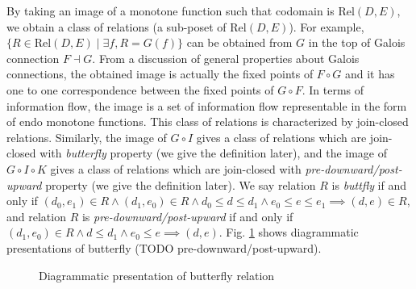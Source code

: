 \documentclass{easychair}
\theoremstyle{definition}
\newcommand{\Rel}{\mathrm{Rel}}
\newcommand{\comp}{\circ}
\newcommand{\rotleq}{\rotatebox[origin=c]{90}{$\leq$}}
\begin{document}
By taking an image of a monotone function such that codomain is $\Rel(D, E)$,
we obtain a class of relations (a sub-poset of $\Rel(D, E)$). For
example, $\{ R \in \Rel(D, E) \mid \exists f, R = G(f) \}$ can be obtained from $G$
in the top of Galois connection $F \dashv G$. From a discussion of general
properties about Galois connections, the obtained image is actually the
fixed points of $F \comp G$ and it has one to one correspondence between
the fixed points of $G \comp F$. In terms of information flow, the image
is a set of information flow representable in the form of endo
monotone functions. This class of relations is characterized by join-closed relations.
Similarly, the image of $G \comp I$ gives a class of relations which are join-closed with \emph{butterfly} property (we give the definition later), and the image of $G \comp I \comp K$ gives a class of relations which are join-closed with \emph{pre-downward/post-upward} property (we give the definition later). We say relation $R$ is \emph{buttfly} if and only if $(d_{0}, e_{1}) \in R \land (d_{1}, e_{0}) \in R \land d_{0} \leq d \leq d_{1} \land e_{0} \leq e \leq e_{1} \implies (d , e) \in R$, and relation $R$ is \emph{pre-downward/post-upward} if and only if $(d_{1}, e_{0}) \in R \land d \leq d_{1} \land e_{0} \leq e \implies (d , e)$. Fig. \ref{fig:butterfly} shows diagrammatic presentations of butterfly (TODO pre-downward/post-upward).

\begin{figure}[h]
  \centering
  \label{fig:butterfly}
  \caption{Diagrammatic presentation of butterfly relation}
\end{figure}
\end{document}
